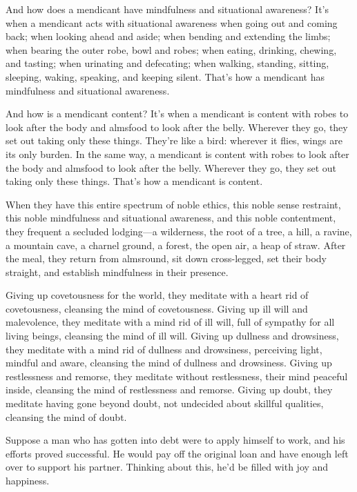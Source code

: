 \documentclass[12pt,openany]{book}%
\begin{document}
And how does a mendicant have mindfulness and situational awareness? It’s when a mendicant acts with situational awareness when going out and coming back; when looking ahead and aside; when bending and extending the limbs; when bearing the outer robe, bowl and robes; when eating, drinking, chewing, and tasting; when urinating and defecating; when walking, standing, sitting, sleeping, waking, speaking, and keeping silent. That’s how a mendicant has mindfulness and situational awareness. 

And how is a mendicant content? It’s when a mendicant is content with robes to look after the body and almsfood to look after the belly. Wherever they go, they set out taking only these things. They’re like a bird: wherever it flies, wings are its only burden. In the same way, a mendicant is content with robes to look after the body and almsfood to look after the belly. Wherever they go, they set out taking only these things. That’s how a mendicant is content. 

When they have this entire spectrum of noble ethics, this noble sense restraint, this noble mindfulness and situational awareness, and this noble contentment, they frequent a secluded lodging—a wilderness, the root of a tree, a hill, a ravine, a mountain cave, a charnel ground, a forest, the open air, a heap of straw. After the meal, they return from almsround, sit down cross-legged, set their body straight, and establish mindfulness in their presence. 

Giving up covetousness for the world, they meditate with a heart rid of covetousness, cleansing the mind of covetousness. Giving up ill will and malevolence, they meditate with a mind rid of ill will, full of sympathy for all living beings, cleansing the mind of ill will. Giving up dullness and drowsiness, they meditate with a mind rid of dullness and drowsiness, perceiving light, mindful and aware, cleansing the mind of dullness and drowsiness. Giving up restlessness and remorse, they meditate without restlessness, their mind peaceful inside, cleansing the mind of restlessness and remorse. Giving up doubt, they meditate having gone beyond doubt, not undecided about skillful qualities, cleansing the mind of doubt. 

Suppose a man who has gotten into debt were to apply himself to work, and his efforts proved successful. He would pay off the original loan and have enough left over to support his partner. Thinking about this, he’d be filled with joy and happiness. 
\end{document}
